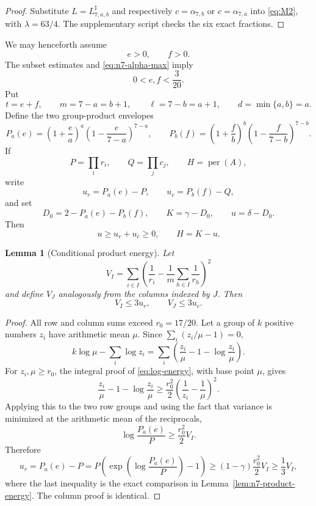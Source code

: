 \documentclass[11pt]{article}
\newtheorem{lemma}[theorem]{Lemma}
\theoremstyle{definition}
\newcommand{\per}{\operatorname{per}}
\newcommand{\1}{\mathbf{1}}
\begin{document}
\begin{proof}
Substitute $L=L^{\sharp}_{7,a,b}$ and respectively
$c=\alpha_{7,b}$ or $c=\alpha_{7,a}$ into \eqref{eq:M2}, with
$\lambda=63/4$.  The supplementary script checks the six exact fractions.
\end{proof}

We may henceforth assume
\[
 e>0,
 \qquad
 f>0.
 \tag{8.18}\label{eq:n7-positive-excesses}
\]
The subset estimates and \eqref{eq:n7-alpha-max} imply
\[
 0<e,f<\frac3{20}.
 \tag{8.19}\label{eq:n7-ef-box}
\]
Put
\[
 t=e+f,
 \qquad
 m=7-a=b+1,
 \qquad
 \ell=7-b=a+1,
 \qquad
 d=\min\{a,b\}=a.
\]
Define the two group-product envelopes
\[
 P_a(e)=\left(1+\frac ea\right)^a
        \left(1-\frac e{7-a}\right)^{7-a},
 \qquad
 P_b(f)=\left(1+\frac fb\right)^b
        \left(1-\frac f{7-b}\right)^{7-b}.
 \tag{8.20}\label{eq:n7-product-envelopes}
\]
If
\[
 P=\prod_i r_i,
 \qquad Q=\prod_jc_j,
 \qquad H=\per(A),
\]
write
\[
 u_r=P_a(e)-P,
 \qquad
 u_c=P_b(f)-Q,
\]
and set
\[
 D_0=2-P_a(e)-P_b(f),
 \qquad
 K=\gamma-D_0,
 \qquad
 u=\delta-D_0.
 \tag{8.21}\label{eq:n7-DKu}
\]
Then
\[
 u\ge u_r+u_c\ge0,
 \qquad
 H=K-u.
 \tag{8.22}\label{eq:n7-u-budget}
\]

\begin{lemma}[Conditional product energy]\label{lem:n7-conditional-energy}
Let
\[
 V_I=\sum_{i\in I}\left(
 \frac1{r_i}-\frac1m\sum_{h\in I}\frac1{r_h}
 \right)^2
\]
and define $V_J$ analogously from the columns indexed by $J$.  Then
\[
 V_I\le3u_r,
 \qquad
 V_J\le3u_c.
 \tag{8.23}\label{eq:n7-conditional-energy}
\]
\end{lemma}

\begin{proof}
All row and column sums exceed $r_0=17/20$.  Let a group of $k$ positive
numbers $z_i$ have arithmetic mean $\mu$.  Since
$\sum_i(z_i/\mu-1)=0$,
\[
 k\log\mu-\sum_i\log z_i
 =\sum_i\left(\frac{z_i}{\mu}-1-
       \log\frac{z_i}{\mu}\right).
\]
For $z_i,\mu\ge r_0$, the integral proof of
\eqref{eq:log-energy}, with base point $\mu$, gives
\[
 \frac{z_i}{\mu}-1-
 \log\frac{z_i}{\mu}
 \ge\frac{r_0^2}{2}
 \left(\frac1{z_i}-\frac1\mu\right)^2.
 \tag{8.24}\label{eq:n7-group-log-energy}
\]
Applying this to the two row groups and using the fact that variance is
minimized at the arithmetic mean of the reciprocals,
\[
 \log\frac{P_a(e)}P\ge\frac{r_0^2}{2}V_I.
\]
Therefore
\[
 u_r=P_a(e)-P
 =P\left(\exp\left(\log\frac{P_a(e)}P\right)-1\right)
 \ge(1-\gamma)\frac{r_0^2}{2}V_I\ge\frac13V_I,
\]
where the last inequality is the exact comparison in
Lemma~\ref{lem:n7-product-energy}.  The column proof is identical.
\end{proof}
\end{document}
